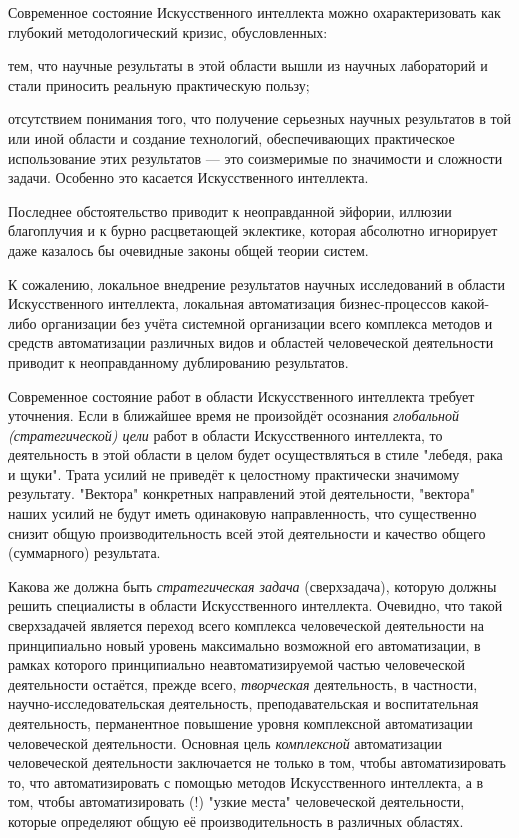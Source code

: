 Современное состояние Искусственного интеллекта можно охарактеризовать как глубокий методологический кризис, обусловленных:
\begin{textitemize}
	\item тем, что научные результаты в этой области вышли из научных лабораторий и стали приносить реальную практическую пользу;
	\item отсутствием понимания того, что получение серьезных научных результатов в той или иной области и создание технологий, обеспечивающих  практическое использование этих результатов --- это соизмеримые по значимости и сложности задачи. Особенно это касается Искусственного интеллекта.
\end{textitemize}

Последнее обстоятельство приводит к неоправданной эйфории, иллюзии благоплучия и к бурно расцветающей эклектике, которая абсолютно игнорирует даже казалось бы очевидные законы общей теории систем.

К сожалению, локальное внедрение результатов научных исследований в области Искусственного интеллекта, локальная автоматизация бизнес-процессов какой-либо организации без учёта системной организации всего комплекса методов и средств автоматизации различных видов и областей человеческой деятельности приводит к неоправданному дублированию результатов. 

Современное состояние работ в области Искусственного интеллекта требует уточнения. Если в ближайшее время не произойдёт осознания \textit{глобальной (стратегической) цели} работ в области Искусственного интеллекта, то деятельность в этой области в целом будет осуществляться в стиле "лебедя, рака и щуки"{}. Трата усилий не приведёт к целостному практически значимому результату. "Вектора"{} конкретных направлений этой деятельности, "вектора"{} наших усилий не будут иметь одинаковую направленность, что существенно снизит общую  производительность всей этой деятельности и качество общего (суммарного) результата.

Какова же должна быть \textit{стратегическая задача} (сверхзадача), которую должны решить специалисты в области Искусственного интеллекта. Очевидно, что такой сверхзадачей является переход всего комплекса человеческой деятельности на принципиально новый уровень максимально возможной его автоматизации, в рамках которого принципиально неавтоматизируемой частью человеческой деятельности остаётся, прежде всего, \textit{творческая} деятельность, в частности, научно-исследовательская деятельность, преподавательская и воспитательная деятельность, перманентное повышение уровня комплексной автоматизации человеческой деятельности. Основная цель \textit{комплексной} автоматизации человеческой деятельности заключается не только в том, чтобы автоматизировать то, что  автоматизировать с помощью методов Искусственного интеллекта, а в том, чтобы автоматизировать (!) "узкие места"{} человеческой деятельности, которые определяют общую её производительность в различных областях.

